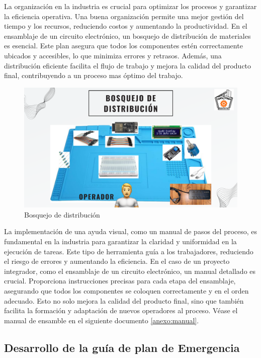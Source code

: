     La organización en la industria es crucial para optimizar los procesos y garantizar la eficiencia operativa. Una buena organización permite una mejor gestión del tiempo y los recursos, reduciendo costos y aumentando la productividad. En el ensamblaje de un circuito electrónico, un bosquejo de distribución de materiales es esencial. Este plan asegura que todos los componentes estén correctamente ubicados y accesibles, lo que minimiza errores y retrasos. Además, una distribución eficiente facilita el flujo de trabajo y mejora la calidad del producto final, contribuyendo a un proceso mas óptimo del trabajo. 
    \begin{figure}[H]
        \centering
        \includegraphics[scale=0.16]{35/Img/bosquejoDistribucion.pdf}
        \caption{Bosquejo de distribución}
        \label{fig:bosquejoDistribucion}
    \end{figure}
    
    
    La implementación de una ayuda visual, como un manual de pasos del proceso, es fundamental en la industria para garantizar la claridad y uniformidad en la ejecución de tareas. Este tipo de herramienta guía a los trabajadores, reduciendo el riesgo de errores y aumentando la eficiencia. En el caso de un proyecto integrador, como el ensamblaje de un circuito electrónico, un manual detallado es crucial. Proporciona instrucciones precisas para cada etapa del ensamblaje, asegurando que todos los componentes se coloquen correctamente y en el orden adecuado. Esto no solo mejora la calidad del producto final, sino que también facilita la formación y adaptación de nuevos operadores al proceso.
    Véase el manual de ensamble en el siguiente documento \ref{anexo:manual}.
    
    \subsection{Desarrollo de la guía de plan de Emergencia}
    
